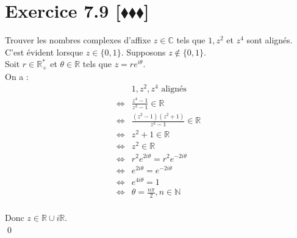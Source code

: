 \documentclass[10pt]{article}
\begin{document}
\section*{Exercice 7.9 [$\blacklozenge\blacklozenge\blacklozenge$]}
\begin{tcolorbox}[enhanced, width=7in, center, size=fbox, fontupper=\large, drop shadow southwest]
    Trouver les nombres complexes d'affixe $z\in\mathbb{C}$ tels que $1,z^2$ et $z^4$ sont alignés.\\
    C'est évident lorsque $z\in\{0,1\}$. Supposons $z\notin\{0,1\}$.\\
    Soit $r\in\mathbb{R_+^*}$ et $\theta\in\mathbb{R}$ tels que $z=re^{i\theta}$.\\ 
    On a :
    \begin{align*}
        &1, z^2, z^4 \text{ alignés } \\
        \iff&\frac{z^4-1}{z^2-1} \in \mathbb{R}\\
        \iff&\frac{(z^2-1)(z^2+1)}{z^2-1}\in\mathbb{R}\\
        \iff&z^2+1 \in \mathbb{R}\\
        \iff&z^2 \in \mathbb{R}\\
        \iff&r^2e^{2i\theta} = r^2e^{-2i\theta}\\
        \iff&e^{2i\theta} = e^{-2i\theta}\\
        \iff&e^{4i\theta}=1\\
        \iff&\theta=\frac{n\pi}{2}, n\in\mathbb{N}\\
    \end{align*}

    Donc $z\in\mathbb{R}\cup i\mathbb{R}$.\\
    \qed
\end{tcolorbox}

\end{document}

